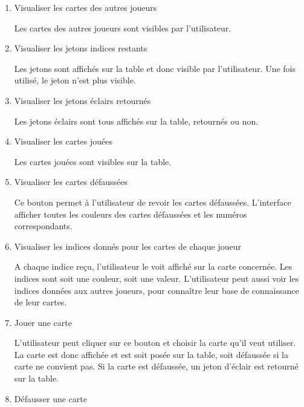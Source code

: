 \documentclass[11pt, letterpaper]{article}
\begin{document}
\begin{enumerate}

\item  {Visualiser les cartes des autres joueurs}

 Les cartes des autres joueurs sont visibles par l'utilisateur.\\

\item  {Visualiser les jetons indices restants}

 Les jetons sont affichés sur la table et donc visible par l'utilisateur. Une fois utilisé, le jeton n'est plus visible.\\

\item  {Visualiser les jetons éclairs retournés}

 Les jetons éclairs sont tous affichés sur la table, retournés ou non.\\

\item  {Visualiser les cartes jouées}

 Les cartes jouées sont visibles sur la table.\\

\item  {Visualiser les cartes défaussées}

 Ce bouton permet à l'utilisateur de revoir les cartes défaussées. L'interface afficher toutes les couleurs des cartes défaussées et les numéros correspondants.\\

\item  {Visualiser les indices donnés pour les cartes de chaque joueur}

 A chaque indice reçu, l'utilisateur le voit affiché sur la carte concernée. Les indices sont soit une couleur, soit une valeur. L'utilisateur peut aussi voir les indices données aux autres joueurs, pour connaître leur base de connaissance de leur cartes.\\

\item  {Jouer une carte}

 L'utilisateur peut cliquer sur ce bouton et choisir la carte qu'il veut utiliser. La carte est donc affichée et est soit posée sur la table, soit défaussée si la carte ne convient pas. Si la carte est défaussée, un jeton d'éclair est retourné sur la table.\\

\item  {Défausser une carte}


\end{enumerate}
\end{document}
